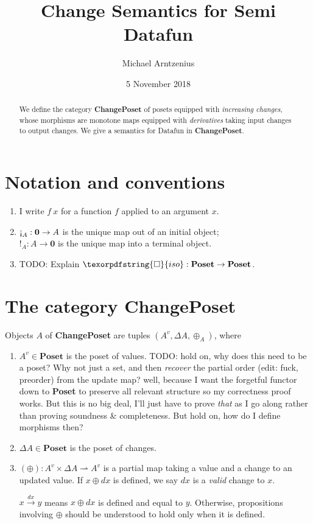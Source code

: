 \documentclass{rntz}
\title{Change Semantics for Semi\naive{} Datafun}
\author{Michael Arntzenius}
\date{5 November 2018}
\newcommand\todo[1]{{\color{Rhodamine}#1}}
\newcommand\cat\textbf
\newcommand\CP{\cat{ChangePoset}}
\newcommand\Poset{\cat{Poset}}
\newcommand\initO{\ensuremath{\mathbold{0}}}
\newcommand\initE{\mathop{\text{\textexclamdown}}}
\newcommand\termI{\mathop{!}}
\newcommand\D\Delta
\newcommand\x\times
\newcommand\iso{\texorpdfstring{\ensuremath{\square}}{iso}}
\newcommand\vals[1]{#1^v} %
\newcommand\chgs[1]{\D{#1}}
\newcommand\validarrow\to
\newcommand\vld[3]{{#2 \mathrel{\overset{#1}{\validarrow}} #3}}
\begin{document}
\maketitle

\begin{abstract}
  We define the category \CP{} of posets equipped with \emph{increasing
    changes}, whose morphisms are monotone maps equipped with \emph{derivatives}
  taking input changes to output changes. We give a semantics for Datafun in
  \CP.
\end{abstract}


\section{Notation and conventions}

\begin{enumerate}
\item I write $f~x$ for a function $f$ applied to an argument $x$.
\item $\initE_A : \initO \to A$ is the unique map out of an initial object;\\
  $\termI_A : A \to \initO$ is the unique map into a terminal object.
\item \todo{TODO: Explain $\iso : \Poset \to \Poset$.}
\end{enumerate}


\section{The category \CP}

\newcommand\pto\rightharpoonup
\newcommand\upd\oplus

Objects $A$ of \CP{} are tuples $(\vals A, \chgs A, \upd_A)$, where
\begin{enumerate}
\item $\vals A \in \Poset$ is the poset of values. \todo{TODO: hold on, why does
  this need to be a poset? Why not just a set, and then \emph{recover} the
  partial order (edit: fuck, preorder) from the update map? well, because I want
  the forgetful functor down to \Poset{} to preserve all relevant structure so
  my correctness proof works. But this is no big deal, I'll just have to prove
  \emph{that} as I go along rather than proving soundness \& completeness. But
  hold on, how do I define morphisms then?}
\item $\chgs A \in \Poset$ is the poset of changes.
\item $(\upd) : \vals A \x \chgs A \pto \vals A$ is a partial map
  taking a value and a change to an updated value. If $x \upd dx$ is defined, we
  say $dx$ is a \emph{valid} change to $x$.

  $\vld{dx} x y$ means $x \upd dx$ is defined and equal to $y$. Otherwise,
  propositions involving $\upd$ should be understood to hold only when it is
  defined.
\end{enumerate}
\end{document}
